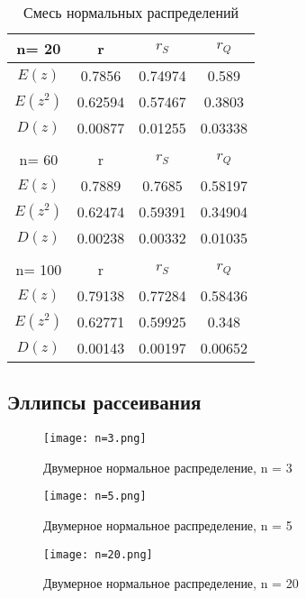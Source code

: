 \documentclass[12pt,a4paper]{scrartcl}
\begin{document}
\begin{table}[H]
\centering
\begin{tabular}{| c | c | c | c |}
\hline
 n= 20    & r       & $r_S$   & $r_Q$   \\ \hline
 $E(z)$   & 0.7856  & 0.74974 & 0.589   \\ \hline
 $E(z^2)$ & 0.62594 & 0.57467 & 0.3803  \\ \hline
 $D(z)$   & 0.00877 & 0.01255 & 0.03338 \\ \hline
&  & & \\  \hline
 n= 60    & r       & $r_S$   & $r_Q$   \\ \hline
 $E(z)$   & 0.7889  & 0.7685  & 0.58197 \\ \hline
 $E(z^2)$ & 0.62474 & 0.59391 & 0.34904 \\ \hline
 $D(z)$   & 0.00238 & 0.00332 & 0.01035 \\ \hline
&  & & \\  \hline
 n= 100   & r       & $r_S$   & $r_Q$   \\ \hline
 $E(z)$   & 0.79138 & 0.77284 & 0.58436 \\ \hline
 $E(z^2)$ & 0.62771 & 0.59925 & 0.348   \\ \hline
 $D(z)$   & 0.00143 & 0.00197 & 0.00652 \\
\hline
\end{tabular}
 \caption{Смесь нормальных распределений}
\label{tab:mix}
\end{table}

\subsection{Эллипсы рассеивания}

	\begin{figure}[H]
		    \centering
		    \texttt{[image: n=3.png]}
		    \caption{Двумерное нормальное распределение, n = 3}
		    \label{fig:f100}
	\end{figure}

	\begin{figure}[H]
	    \centering
	    \texttt{[image: n=5.png]}
	    \caption{Двумерное нормальное распределение, n = 5}
	    \label{fig:f100}
	\end{figure}
	
	\begin{figure}[H]
	    \centering
	    \texttt{[image: n=20.png]}
	    \caption{ Двумерное нормальное распределение, n = 20}
	    \label{fig:f20}
	\end{figure}
	
\end{document}
